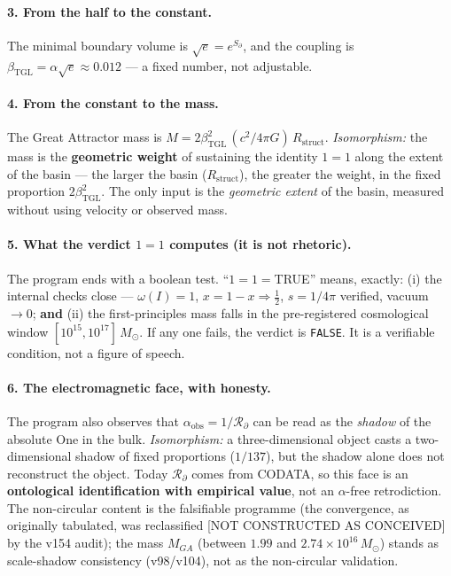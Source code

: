 \documentclass[11pt]{article}
\newcommand{\bTGL}{\beta_{\mathrm{TGL}}}\newcommand{\Msun}{M_{\odot}}\newcommand{\TGL}{\mathrm{TGL}}
\theoremstyle{definition}\newtheorem{deriv}{Derivation}
\begin{document}
\paragraph{3. From the half to the constant.} The minimal boundary volume is $\sqrt e=e^{S_\partial}$, and the coupling is $\bTGL=\alpha\sqrt e\approx0.012$ --- a fixed number, not adjustable.

\paragraph{4. From the constant to the mass.} The Great Attractor mass is $M=2\bTGL^2\,(c^2/4\pi G)\,R_{\mathrm{struct}}$. \emph{Isomorphism:} the mass is the \textbf{geometric weight} of sustaining the identity $1=1$ along the extent of the basin --- the larger the basin ($R_{\mathrm{struct}}$), the greater the weight, in the fixed proportion $2\bTGL^2$. The only input is the \emph{geometric extent} of the basin, measured without using velocity or observed mass.

\paragraph{5. What the verdict $1=1$ computes (it is not rhetoric).} The program ends with a boolean test. ``$1=1=$TRUE'' means, exactly: (i) the internal checks close --- $\omega(I)=1$, $x=1-x\Rightarrow\tfrac12$, $s=1/4\pi$ verified, vacuum $\to0$; \textbf{and} (ii) the first-principles mass falls in the pre-registered cosmological window $[10^{15},10^{17}]\,\Msun$. If any one fails, the verdict is \texttt{FALSE}. It is a verifiable condition, not a figure of speech.

\paragraph{6. The electromagnetic face, with honesty.} The program also observes that $\alpha_{\mathrm{obs}}=1/\mathcal{R}_\partial$ can be read as the \emph{shadow} of the absolute One in the bulk. \emph{Isomorphism:} a three-dimensional object casts a two-dimensional shadow of fixed proportions ($1/137$), but the shadow alone does not reconstruct the object. Today $\mathcal{R}_\partial$ comes from CODATA, so this face is an \textbf{ontological identification with empirical value}, not an $\alpha$-free retrodiction. The non-circular content is the falsifiable programme (the convergence, as originally tabulated, was reclassified [NOT CONSTRUCTED AS CONCEIVED] by the v154 audit); the mass $M_{GA}$ (between $1.99$ and $2.74\times10^{16}\,\Msun$) stands as scale-shadow consistency (v98/v104), not as the non-circular validation.
\end{document}
